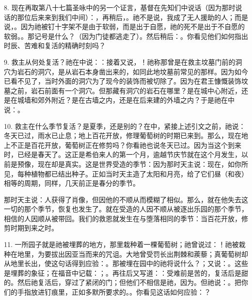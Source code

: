 8. 现在再取第八十七篇圣咏中的另一个证言，基督在先知们中说话（因为那时说话的那位后来来到我们中间）：，再稍后，。祂不是说，我成了无人援助的人；而是说，。因为祂被钉十字架不是由于软弱，而是出于自愿，祂的死不是出于不自愿的软弱。。那记号是什么？（因为门徒都逃走了）。然后稍后：。你看见他们如何指出时辰、苦难和复活的精确时刻吗？\par

9. 救主从何处复活？祂在中说：：接着又说，！祂称那曾是在救主坟墓门前的洞穴为岩石的洞穴，是从岩石本身凿出来的，如同此地坟墓前常见的那样。因为如今已看不见了，当时外面的洞穴为了现今的装饰而被切除了。因为在君王慷慨装饰坟墓之前，岩石前面有一个洞穴。但那藏有洞穴的岩石在哪里？是在城中心附近，还是在城墙和郊外附近？是在古墙之内，还是在后来建的外墙之内？于是祂在中说：。\par

10. 救主在什么季节复活？是夏季，还是别的？在中，紧接上述引文之前，祂说：冬天已过，雨水已止息；地上百花开放，修理葡萄树的时期已来到。那么，现在地上不正是百花开放，葡萄树正在修剪吗？你看祂也说冬天已过。因为当这个到来时，已经是春天了。这正是希伯来人的第一个月，逾越节庆节就在这个月发生，以前是预像，现在却是真实。这是世界受造的季节：因为那时天主说：现在，如你所见，每种植物都已结出种子。正如当时天主造了太阳和月亮，给了它们昼（和夜）相等的周期，同样，几天前正是春分的季节。\par

那时天主说：人获得了肖像，但因他的不顺从而模糊了相似。那么，就在他失去这一切的那个季节，恢复也发生了。就在受造的人因不顺从被逐出乐园的那个季节，相信的人因顺从被带回。我们的救恩就发生在与堕落相同的季节：当百花开放，修剪时期到来之时。\par

11. 一所园子就是祂被埋葬的地方，那里栽种着一棵葡萄树；祂曾说过：！祂被栽种在地里，为要拔出因亚当而来的咒诅。大地曾受罚长出荆棘和蒺藜；真葡萄树却从地里长出，使这句话得到应验：。那被埋在园中的祂将说什么？；又说：。这些是埋葬的象征；在福音中记载：；。再往后又写道：：受难前是苦的，复活后是甜的。然后祂复活后，穿过了紧闭的门；但他们不相信是祂，因为。但祂说：。把你们的手指放进钉痕里，正如多默所要求的。。你看见这话如何应验：？\par

